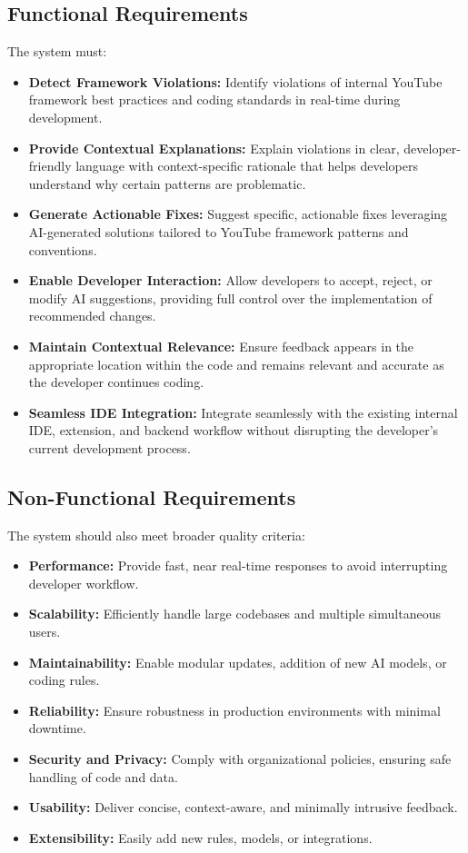 \begin{spacing}{1.2}
\subsection{Functional Requirements}
The system must:
\begin{itemize}
    \item \textbf{Detect Framework Violations:} Identify violations of internal YouTube framework best practices and coding standards in real-time during development.
    
    \item \textbf{Provide Contextual Explanations:} Explain violations in clear, developer-friendly language with context-specific rationale that helps developers understand why certain patterns are problematic.
    
    \item \textbf{Generate Actionable Fixes:} Suggest specific, actionable fixes leveraging AI-generated solutions tailored to YouTube framework patterns and conventions.
    
    \item \textbf{Enable Developer Interaction:} Allow developers to accept, reject, or modify AI suggestions, providing full control over the implementation of recommended changes.
    
    \item \textbf{Maintain Contextual Relevance:} Ensure feedback appears in the appropriate location within the code and remains relevant and accurate as the developer continues coding.
    
    \item \textbf{Seamless IDE Integration:} Integrate seamlessly with the existing internal IDE, extension, and backend workflow without disrupting the developer's current development process.
\end{itemize}

\subsection{Non-Functional Requirements}
The system should also meet broader quality criteria:
\begin{itemize}
    \item \textbf{Performance:} Provide fast, near real-time responses to avoid interrupting developer workflow.
    \item \textbf{Scalability:} Efficiently handle large codebases and multiple simultaneous users.
    \item \textbf{Maintainability:} Enable modular updates, addition of new AI models, or coding rules.
    \item \textbf{Reliability:} Ensure robustness in production environments with minimal downtime.
    \item \textbf{Security and Privacy:} Comply with organizational policies, ensuring safe handling of code and data.
    \item \textbf{Usability:} Deliver concise, context-aware, and minimally intrusive feedback.
    \item \textbf{Extensibility:} Easily add new rules, models, or integrations.
\end{itemize}


\end{spacing}
